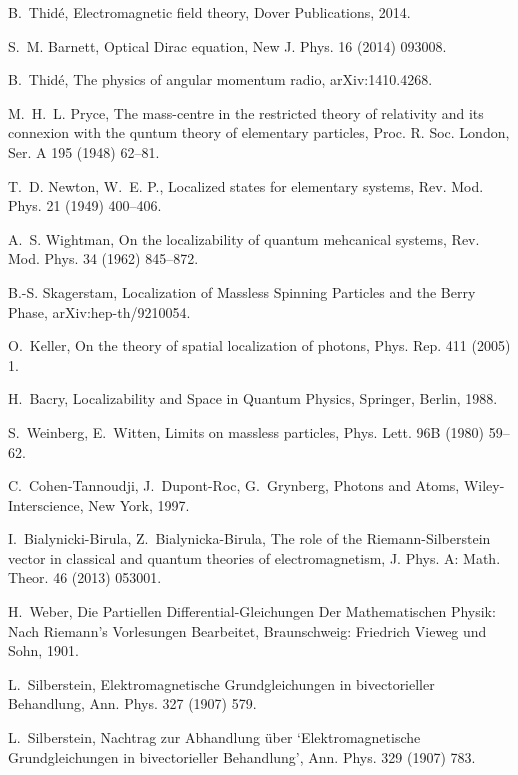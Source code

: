 \documentclass[1p,sort&compress]{elsarticle}
\numberwithin{equation}{section}
\begin{document}
\begin{thebibliography}{999}
B.~Thid\'e, {Electromagnetic field theory}, Dover Publications, 2014.

S.~M. Barnett, {Optical Dirac equation}, New J. Phys. 16 (2014) 093008.

B.~Thid\'e, {The physics of angular momentum radio}, arXiv:1410.4268.

M.~H.~L. Pryce, {The mass-centre in the restricted theory of relativity and its
  connexion with the quntum theory of elementary particles}, Proc. R. Soc.
  London, Ser. A 195 (1948) 62--81.

T.~D. Newton, W.~E. P., {Localized states for elementary systems}, Rev. Mod.
  Phys. 21 (1949) 400--406.

A.~S. Wightman, {On the localizability of quantum mehcanical systems}, Rev.
  Mod. Phys. 34 (1962) 845--872.

B.-S. Skagerstam, {Localization of Massless Spinning Particles and the Berry
  Phase}, arXiv:hep-th/9210054.

O.~Keller, {On the theory of spatial localization of photons}, Phys. Rep. 411
  (2005) 1.

H.~Bacry, {Localizability and Space in Quantum Physics}, Springer, Berlin,
  1988.

S.~Weinberg, E.~Witten, {Limits on massless particles}, Phys. Lett. 96B (1980)
  59--62.

C.~Cohen-Tannoudji, J.~Dupont-Roc, G.~Grynberg, {Photons and Atoms},
  Wiley-Interscience, New York, 1997.

I.~Bialynicki-Birula, Z.~Bialynicka-Birula, {The role of the
  Riemann-Silberstein vector in classical and quantum theories of
  electromagnetism}, J. Phys. A: Math. Theor. 46 (2013) 053001.

H.~Weber, {Die Partiellen Differential-Gleichungen Der Mathematischen Physik:
  Nach Riemann's Vorlesungen Bearbeitet}, Braunschweig: Friedrich Vieweg und
  Sohn, 1901.

L.~Silberstein, {Elektromagnetische Grundgleichungen in bivectorieller
  Behandlung}, Ann. Phys. 327 (1907) 579.

L.~Silberstein, {Nachtrag zur Abhandlung \"uber `Elektromagnetische
  Grundgleichungen in bivectorieller Behandlung'}, Ann. Phys. 329 (1907) 783.


\end{thebibliography}
\end{document}
